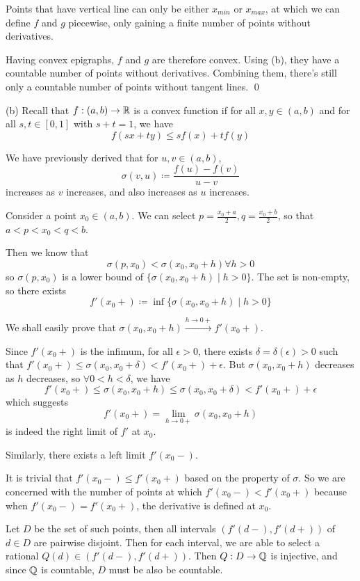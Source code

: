 \documentclass[a4paper, 11pt]{article}
\begin{document}
\begin{solution}
    Points that have vertical line can only be either $x_{min}$ or $x_{max}$, at which we can define $f$ and $g$ piecewise, only gaining a finite number of points without derivatives.

    Having convex epigraphs, $f$ and $g$ are therefore convex. Using (b), they have a countable number of points without derivatives. Combining them, there's still only a countable number of points without tangent lines. \qed

    (b) Recall that $f: (a, b) \to \mathbb{R}$ is a convex function if for all $x, y \in (a, b)$ and for all $s, t \in [0, 1]$ with $s+ t = 1$, we have \[
    f(sx + ty) \leq sf(x) + tf(y)   
    \]
    
    We have previously derived that for $u, v \in (a, b)$, \[    
        \sigma(v, u) \coloneqq \frac{f(u) - f(v)}{u-v}
    \]
    increases as $v$ increases, and also increases as $u$ increases.

    Consider a point $x_0 \in (a, b)$. We can select $p = \frac{x_0 + a}{2}, q = \frac{x_0 + b}{2}$, so that $a < p < x_0 < q < b$.

    Then we know that \[
        \sigma(p, x_0) < \sigma(x_0, x_0 + h) \forall h > 0
    \]
    so $\sigma(p, x_0)$ is a lower bound of $\{\sigma(x_0, x_0 + h) \mid h > 0 \}$. The set is non-empty, so there exists \[
        f'(x_0+) \coloneqq \inf \{\sigma(x_0, x_0 +h) \mid h > 0\}
    \]

    We shall easily prove that $\sigma(x_0, x_0 + h) \xrightarrow{h \to 0+} f'(x_0+)$. 
    
    Since $f'(x_0+)$ is the infimum, for all $\epsilon > 0$, there exists $\delta = \delta(\epsilon) > 0$ such that $f'(x_0+) \leq \sigma(x_0, x_0 + \delta) < f'(x_0+) + \epsilon$. But $\sigma(x_0, x_0 + h)$ decreases as $h$ decreases, so $\forall 0 < h < \delta$, we have \[
    f'(x_0+) \leq \sigma(x_0, x_0 + h) \leq \sigma(x_0, x_0 + \delta) < f'(x_0+) + \epsilon
    \]
    which suggests \[
        f'(x_0+) = \lim_{h \to 0+} \sigma(x_0, x_0 + h)
    \]
    is indeed the right limit of $f'$ at $x_0$.

    Similarly, there exists a left limit $f'(x_0-)$.

    It is trivial that $f'(x_0-) \leq f'(x_0+)$ based on the property of $\sigma$. So we are concerned with the number of points at which $f'(x_0-) < f'(x_0+)$  because when $f'(x_0-) = f'(x_0+)$, the derivative is defined at $x_0$.

    Let $D$ be the set of such points, then all intervals $(f'(d-) , f'(d+))$ of $d \in D$ are pairwise disjoint. Then for each interval, we are able to select a rational $Q(d) \in (f'(d-) , f'(d+))$. Then $Q: D \to \mathbb{Q}$ is injective, and since $\mathbb{Q}$ is countable, $D$ must be also be countable.
\end{solution}
\end{document}

